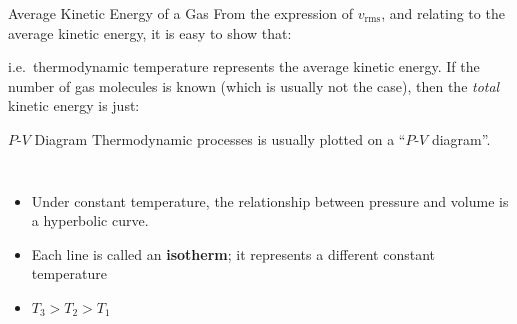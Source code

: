 \documentclass[12pt,aspectratio=169]{beamer}
\newcommand{\mb}[1]{\mathbf{#1}}
\newcommand{\eq}[2]{\vspace{#1}{\Large\begin{displaymath}#2\end{displaymath}}}
\begin{document}
%
%
%
%
%
%
%
\begin{frame}{Average Kinetic Energy of a Gas}
  From the expression of $v_\mathrm{rms}$, and relating to the average kinetic
  energy, it is easy to show that:
  
  \eq{-.2in}{
    \langle K \rangle=\frac12v_\mathrm{rms}^2=
    \frac12\left(\sqrt{\frac{3k_BT}{m}}\right)^2
    \quad\rightarrow\quad
    \boxed{\langle K\rangle=\frac32k_BT}
  }

  i.e.\ thermodynamic temperature represents the average kinetic energy. If the
  number of gas molecules is known (which is usually not the case), then the
  \emph{total} kinetic energy is just:

  \eq{-.2in}{
    K=N\langle K\rangle=\frac32Nk_BT
  }
\end{frame}



\begin{frame}{$P$-$V$ Diagram}
  Thermodynamic processes is usually plotted on a ``$P$-$V$ diagram''.
  \begin{columns}

    \begin{itemize}
    \item Under constant temperature, the relationship between pressure and
      volume is a hyperbolic curve.
    \item Each line is called an \textbf{isotherm}; it represents a different
      constant temperature
    \item $T_3>T_2>T_1$
    \end{itemize}
  \end{columns}
  
\end{frame}
\end{document}
